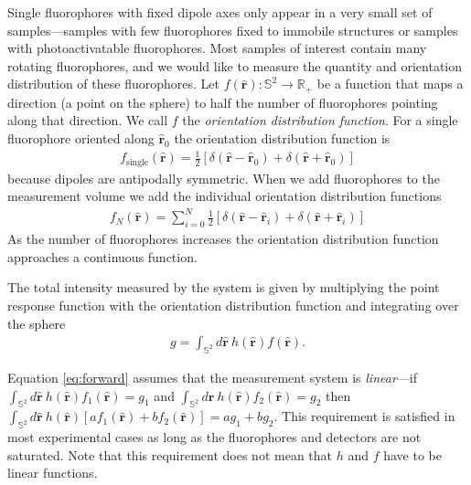 \documentclass[10pt]{article}
\providecommand{\mh}[1]{\mathbf{\hat{#1}}}
\providecommand{\mbb}[1]{\mathbb{#1}}
\begin{document}
Single fluorophores with fixed dipole axes only appear in a very small set of
samples---samples with few fluorophores fixed to immobile structures or samples
with photoactivatable fluorophores. Most samples of interest contain many
rotating fluorophores, and we would like to measure the quantity and orientation
distribution of these fluorophores. Let
$f(\mh{r}): \mbb{S}^2 \rightarrow \mbb{R}_+$ be a function that maps a direction
(a point on the sphere) to half the number of fluorophores pointing along that
direction. We call $f$ the \textit{orientation distribution
  function}. For a single fluorophore oriented along $\mh{r}_0$ the orientation
distribution function is
\begin{align}
  f_{\text{single}}(\mh{r}) = \frac{1}{2}\left[\delta(\mh{r} - \mh{r}_0) + \delta(\mh{r} + \mh{r}_0)\right]
\end{align}
because dipoles are antipodally symmetric. When we add fluorophores to the measurement
volume we add the individual orientation distribution functions
\begin{align}
  f_{N}(\mh{r}) = \sum_{i=0}^N \frac{1}{2}\left[\delta(\mh{r} - \mh{r}_i) + \delta(\mh{r} + \mh{r}_i)\right]
\end{align}
As the number of fluorophores increases the orientation distribution function
approaches a continuous function.

The total intensity measured by the system is given by multiplying the point
response function with the orientation distribution function and integrating
over the sphere
\begin{align}
  g = \int_{\mathbb{S}^2}d\mh{r}\ h(\mh{r})f(\mh{r}). \label{eq:forward}
\end{align}

Equation \ref{eq:forward} assumes that the measurement system is
\textit{linear}---if $\int_{\mathbb{S}^2}d\mh{r}\ h(\mh{r})f_1(\mh{r}) = g_1$
and $\int_{\mathbb{S}^2}d\mh{r}\ h(\mh{r})f_2(\mh{r}) = g_2$ then
$\int_{\mathbb{S}^2}d\mh{r}\ h(\mh{r})[af_1(\mh{r}) + bf_2(\mh{r})] =
ag_1+bg_2$. This requirement is satisfied in most experimental cases as long as
the fluorophores and detectors are not saturated. Note that this requirement
does not mean that $h$ and $f$ have to be linear functions.
\end{document}

